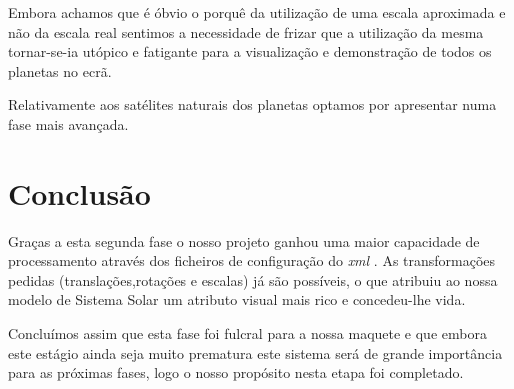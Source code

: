 \documentclass[11pt,a4paper]{report}
\begin{document}
Embora achamos que é óbvio o porquê da utilização de uma escala aproximada e não da escala real sentimos a necessidade de frizar que a utilização da mesma  tornar-se-ia utópico e fatigante para a visualização e demonstração de todos os planetas no ecrã.

Relativamente aos satélites naturais dos planetas optamos por apresentar numa fase mais avançada.

\chapter{Conclusão}

Graças a esta segunda fase o nosso projeto ganhou uma maior capacidade de processamento através dos ficheiros de configuração do \emph{xml} .
As transformações pedidas (translações,rotações e escalas) já são possíveis,  o que atribuiu ao nossa modelo de Sistema Solar um atributo visual mais rico e concedeu-lhe vida.

Concluímos assim que esta fase foi fulcral para a nossa maquete e que embora este estágio ainda seja muito prematura este sistema será de grande importância para as próximas fases, logo o nosso propósito nesta etapa foi completado.
\end{document}
